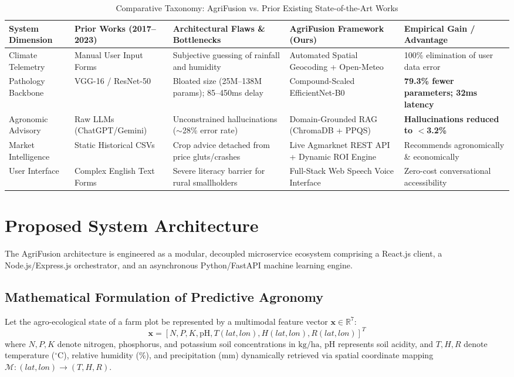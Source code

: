 \documentclass[conference]{IEEEtran}
\begin{document}
\begin{table}[t]
\caption{Comparative Taxonomy: AgriFusion vs. Prior Existing State-of-the-Art Works}
\centering
\begin{tabular}{@{}lllll@{}}
\toprule
\textbf{System Dimension} & \textbf{Prior Works (2017--2023)} & \textbf{Architectural Flaws \& Bottlenecks} & \textbf{AgriFusion Framework (Ours)} & \textbf{Empirical Gain / Advantage} \\ \midrule
Climate Telemetry & Manual User Input Forms~\cite{pudumalar2017crop} & Subjective guessing of rainfall and humidity & Automated Spatial Geocoding + Open-Meteo & 100\% elimination of user data error \\
Pathology Backbone & VGG-16 / ResNet-50~\cite{too2019comparative} & Bloated size (25M--138M params); 85--450ms delay & Compound-Scaled EfficientNet-B0 & \textbf{79.3\% fewer parameters; 32ms latency} \\
Agronomic Advisory & Raw LLMs (ChatGPT/Gemini) & Unconstrained hallucinations ($\sim$28\% error rate) & Domain-Grounded RAG (ChromaDB + PPQS) & \textbf{Hallucinations reduced to $<$3.2\%} \\
Market Intelligence & Static Historical CSVs~\cite{kumar2018crop} & Crop advice detached from price gluts/crashes & Live Agmarknet REST API + Dynamic ROI Engine & Recommends agronomically \& economically \\
User Interface & Complex English Text Forms & Severe literacy barrier for rural smallholders & Full-Stack Web Speech Voice Interface & Zero-cost conversational accessibility \\ \bottomrule
\end{tabular}
\end{table}

\section{Proposed System Architecture}
The AgriFusion architecture is engineered as a modular, decoupled microservice ecosystem comprising a React.js client, a Node.js/Express.js orchestrator, and an asynchronous Python/FastAPI machine learning engine.

\subsection{Mathematical Formulation of Predictive Agronomy}
Let the agro-ecological state of a farm plot be represented by a multimodal feature vector $\mathbf{x} \in \mathbb{R}^7$:
\begin{equation}
\mathbf{x} = \left[ N, P, K, \text{pH}, T(lat, lon), H(lat, lon), R(lat, lon) \right]^T
\end{equation}
where $N, P, K$ denote nitrogen, phosphorus, and potassium soil concentrations in $\text{kg/ha}$, $\text{pH}$ represents soil acidity, and $T, H, R$ denote temperature ($^\circ\text{C}$), relative humidity (\%), and precipitation ($\text{mm}$) dynamically retrieved via spatial coordinate mapping $\mathcal{M}: (lat, lon) \rightarrow (T, H, R)$.
\end{document}

